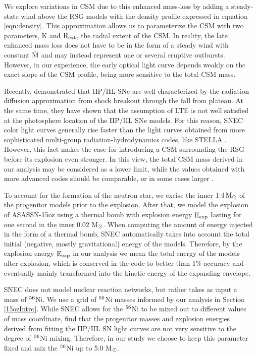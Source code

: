 \documentclass[a4paper,fleqn,usenatbib]{mnras}
\newcommand{\msunperiod}{M$\rm{_{\odot}}$}
\begin{document}
We explore variations in CSM due to this enhanced mass-loss by adding a steady-state wind above the RSG models with the density profile expressed in equation \ref{eqn:density}.
This approximation allows us to parameterize the CSM with two parameters, K and $\rm{R_{ext}}$, the radial extent of the CSM.
In reality, the late enhanced mass loss does not have to be in the form of a steady wind with constant $\rm{\dot{M}}$ and may instead represent one or several eruptive outbursts. However, in our experience, the early optical light curve depends weakly on the exact slope of the CSM profile, being more sensitive to the total CSM mass.

Recently, \citet{2018paxton} demonstrated that IIP/IIL SNe are well characterized by the radiation diffusion approximation from shock breakout through the fall from plateau.
At the same time, they have shown that the assumption of LTE is not well satisfied at the photosphere location of the IIP/IIL SNe models. 
For this reason, SNEC color light curves generally rise faster than the light curves obtained from more sophisticated multi-group radiation-hydrodynamics codes, like STELLA \citep{2018paxton}. 
However, this fact makes the case for introducing a CSM surrounding the RSG before its explosion even stronger.
In this view, the total CSM mass derived in our analysis may be considered as a lower limit, while the values obtained with more advanced codes should be comparable, or in some cases larger \citep{2017moriya,2018paxton}.

To account for the formation of the neutron star, we excise the inner $\rm{1.4\,M_{\odot}}$ of the progenitor models prior to the explosion. 
After that, we model the explosion of ASASSN-15oz using a thermal bomb with explosion energy $\rm{E_{exp}}$ lasting for one second in the inner 0.02 \msunperiod. 
When computing the amount of energy injected in the form of a thermal bomb, SNEC automatically takes into account the total initial (negative, mostly gravitational) energy of the models. 
Therefore, by the explosion energy $\rm{E_{exp}}$ in our analysis we mean the total energy of the models after explosion, which is conserved in the code to better than 1\% accuracy and eventually mainly transformed into the kinetic energy of the expanding envelope.

SNEC does not model nuclear reaction networks, but rather takes as input a mass of $\rm{{}^{56}}$Ni. 
We use a grid of $\rm{{}^{56}}$Ni masses informed by our analysis in Section \ref{15ozIntro}.
While SNEC allows for the $\rm{{}^{56}}$Ni to be mixed out to different values of mass coordinate, \citet{2017morozova} find that the progenitor masses and explosion energies derived from fitting the IIP/IIL SN light curves are not very sensitive to the degree of $\rm{{}^{56}}$Ni mixing.
Therefore, in our study we choose to keep this parameter fixed and mix the $\rm{{}^{56}}$Ni up to 5.0 M$\rm{_{\odot}}$.
\end{document}
